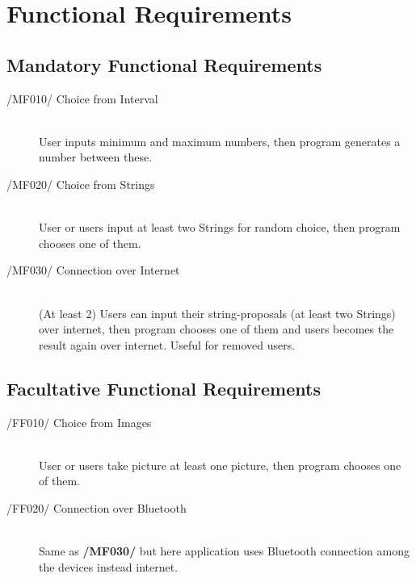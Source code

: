 \newpage
\section{Functional Requirements}

\subsection{Mandatory Functional Requirements}
\begin{description}
\item[/MF010/ Choice from Interval]\hfill \\ User inputs minimum and maximum numbers, then program generates a number between these.
\item[/MF020/ Choice from Strings]\hfill \\ User or users input at least two Strings for random choice, then program chooses one of them.
\item[/MF030/ Connection over Internet]\hfill \\ (At least 2) Users can input their string-proposals (at least two Strings) over internet, then program chooses one of them and users becomes the result again over internet. Useful for removed users.
\end{description}

\subsection{Facultative Functional Requirements}
\begin{description}
\item[/FF010/ Choice from Images]\hfill \\ User or users take picture at least one picture, then program chooses one of them.
\item[/FF020/ Connection over Bluetooth] \\ Same as \textbf{/MF030/} but here application uses Bluetooth connection among the devices instead internet.
\end{description}